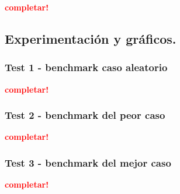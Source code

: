 \vspace*{0.3cm}

\textcolor{red}{\textbf{completar!}}



\newpage
\subsection{Experimentación y gráficos.}

\vspace*{0.3cm}

\subsubsection{Test 1 - benchmark caso aleatorio}

\textcolor{red}{\textbf{completar!}}


\newpage
\subsubsection{Test 2 - benchmark del peor caso}

\textcolor{red}{\textbf{completar!}}


\newpage
\subsubsection{Test 3 - benchmark del mejor caso}

\textcolor{red}{\textbf{completar!}}
